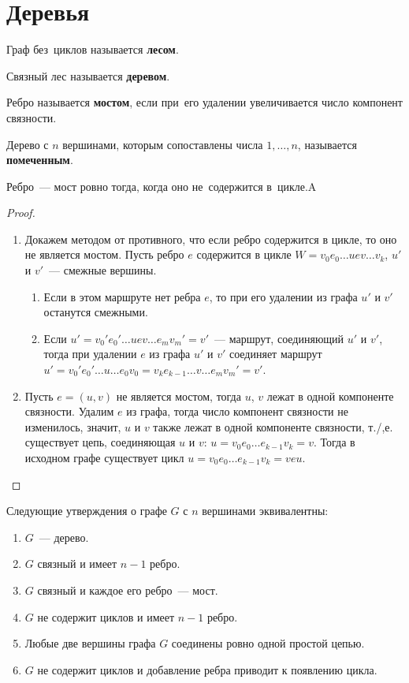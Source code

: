 \section{Деревья}

Граф без~циклов называется \textbf{лесом}.

Связный лес называется \textbf{деревом}.

Ребро называется \textbf{мостом}, если при~его удалении увеличивается число компонент связности.

Дерево с $n$ вершинами, которым сопоставлены числа $1, \ldots, n$, называется \textbf{помеченным}.

\begin{statement}
Ребро~--- мост ровно тогда, когда оно не~содержится в~цикле.A
\end{statement}
\begin{proof}
\begin{enumerate}
	\item Докажем методом от противного, что если ребро содержится в цикле, то оно не является мостом. Пусть ребро $e$ содержится в цикле $W = v_0 e_0 \ldots u e v \ldots v_k$, $u'$ и $v'$~--- смежные вершины.
	\begin{enumerate}
		\item Если в этом маршруте нет ребра $e$, то при его удалении из графа $u'$ и $v'$ останутся смежными.
		\item Если $u' = v_0' e_0' \ldots u e v \ldots e_m v_m' = v'$~--- маршрут, соединяющий $u'$ и $v'$, тогда при удалении $e$ из графа $u'$ и $v'$ соединяет маршрут $u' = v_0' e_0' \ldots u \ldots e_0 v_0 = v_k e_{k-1} \ldots v \ldots e_m v_m' = v'$.
	\end{enumerate}
	\item Пусть $e = (u, v)$ не является мостом, тогда $u$, $v$ лежат в одной компоненте связности. Удалим $e$ из графа, тогда число компонент связности не изменилось, значит, $u$ и $v$ также лежат в одной компоненте связности, т./,е. существует цепь, соединяющая $u$ и $v$: $u = v_0 e_0 \ldots e_{k-1} v_k = v$. Тогда в исходном графе существует цикл $u = v_0 e_0 \ldots e_{k-1} v_k = v e u$.
\end{enumerate}
\end{proof}
\begin{theorem}
Следующие утверждения о графе $G$ с $n$ вершинами эквивалентны:
\begin{enumerate}
	\item $G$~--- дерево.
	\item $G$ связный и имеет $n - 1$ ребро.
	\item $G$ связный и каждое его ребро~--- мост.
	\item $G$ не содержит циклов и имеет $n - 1$ ребро.
	\item Любые две вершины графа $G$ соединены ровно одной простой цепью.
	\item $G$ не содержит циклов и добавление ребра приводит к появлению цикла.
\end{enumerate}
\end{theorem}
